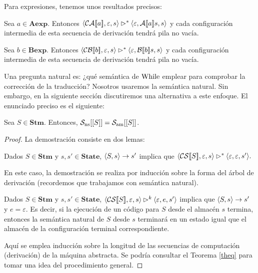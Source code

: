 Para expresiones, tenemos unos resultados precisos:

\begin{lema} \label{lemaam3}
Sea $a \in \mathbf{Aexp}$. Entonces $\langle \mathcal{CA}[\![a]\!], \varepsilon, s \rangle\rhd^*\langle \varepsilon, \mathcal{A}[\![a]\!]s, s \rangle$ y cada configuración intermedia de esta secuencia de derivación tendrá pila no vacía.
\end{lema}

\begin{lema} \label{lemaam4}
Sea $b \in \mathbf{Bexp}$. Entonces $\langle \mathcal{CB}[\![b]\!], \varepsilon, s \rangle\rhd^*\langle \varepsilon, \mathcal{B}[\![b]\!]s, s \rangle$ y cada configuración intermedia de esta secuencia de derivación tendrá pila no vacía.
\end{lema}

Una pregunta natural es: ¿qué semántica de $\mathrm{While}$ emplear para comprobar la corrección de la traducción? Nosotros usaremos la semántica natural. Sin embargo, en la siguiente sección discutiremos una alternativa a este enfoque. El enunciado preciso es el siguiente:

\begin{theorem}
Sea $S \in \mathbf{Stm}$. Entonces, $\mathcal{S}_{\mathrm{ns}}[[S]] = \mathcal{S}_{\mathrm{am}}[[S]]$.
\end{theorem}
\begin{proof}
La demostración consiste en dos lemas:
\begin{lema}
Dados $S \in \mathbf{Stm}$ y $s, s' \in \mathbf{State}$, 
$\langle S, s \rangle\to s'$ implica que $\langle \mathcal{CS}[\![S]\!], \varepsilon, s \rangle\rhd^* \langle \varepsilon, \varepsilon, s' \rangle.$
\end{lema}
En este caso, la demostración se realiza por inducción sobre la forma del árbol de derivación (recordemos que trabajamos con semántica natural).
\begin{lema}
Dados $S \in \mathbf{Stm}$ y $s, s' \in \mathbf{State}$, 
$\langle \mathcal{CS}[\![S]\!], \varepsilon, s \rangle \rhd^k \langle \varepsilon, e, s' \rangle$ implica que $\langle S, s \rangle\to s'$ y $e=\varepsilon.$ Es decir, si la ejecución de un código para $S$ desde el almacén $s$ termina, entonces la semántica natural de $S$ desde $s$ terminará en un estado igual que el almacén de la configuración terminal correspondiente.
\end{lema}
Aquí se emplea inducción sobre la longitud de las secuencias de computación (derivación) de la máquina abstracta. Se podría consultar el Teorema \ref{theq} para tomar una idea del procedimiento general.
\end{proof}

